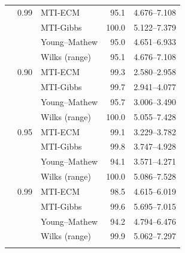 \begin{longtable}{@{}rrlrr@{}}
\addlinespace[0.3em]
500 & 0.99 & MTI-ECM & 95.1 & 4.676--7.108 \\
 &  & MTI-Gibbs & 100.0 & 5.122--7.379 \\
 &  & Young--Mathew & 95.0 & 4.651--6.933 \\
 &  & Wilks (range) & 95.1 & 4.676--7.108 \\
\addlinespace[0.3em]
1000 & 0.90 & MTI-ECM & 99.3 & 2.580--2.958 \\
 &  & MTI-Gibbs & 99.7 & 2.941--4.077 \\
 &  & Young--Mathew & 95.7 & 3.006--3.490 \\
 &  & Wilks (range) & 100.0 & 5.055--7.428 \\
\addlinespace[0.3em]
1000 & 0.95 & MTI-ECM & 99.1 & 3.229--3.782 \\
 &  & MTI-Gibbs & 99.8 & 3.747--4.928 \\
 &  & Young--Mathew & 94.1 & 3.571--4.271 \\
 &  & Wilks (range) & 100.0 & 5.086--7.528 \\
\addlinespace[0.3em]
1000 & 0.99 & MTI-ECM & 98.5 & 4.615--6.019 \\
 &  & MTI-Gibbs & 99.6 & 5.695--7.015 \\
 &  & Young--Mathew & 94.2 & 4.794--6.476 \\
 &  & Wilks (range) & 99.9 & 5.062--7.297 \\
\addlinespace[0.3em]
\end{longtable}
\clearpage
